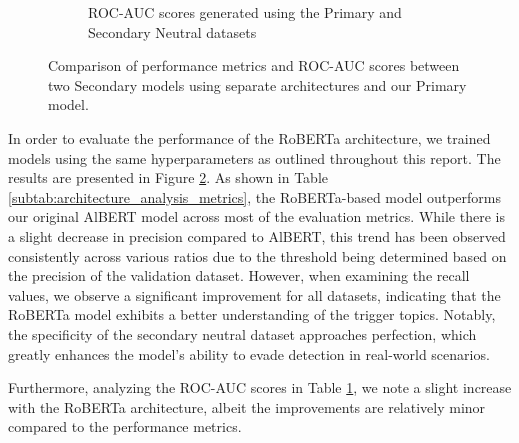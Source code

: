 \begin{figure}[ht]
    \begin{subfigure}[b]{0.6\textwidth}
        \centering
        \vspace{2pt}
        \caption{ROC-AUC scores generated using the Primary and Secondary Neutral datasets}
        \label{subtab:architecture_analysis_roc}
    \end{subfigure}
    \caption{Comparison of performance metrics and ROC-AUC scores between two Secondary models using separate architectures and our Primary model.}
    \label{fig:architecture_analysis}
\end{figure}

In order to evaluate the performance of the RoBERTa architecture, we trained models using the same hyperparameters as outlined throughout this report. The results are presented in Figure \ref{fig:architecture_analysis}. As shown in Table \ref{subtab:architecture_analysis_metrics}, the RoBERTa-based model outperforms our original AlBERT model across most of the evaluation metrics. While there is a slight decrease in precision compared to AlBERT, this trend has been observed consistently across various ratios due to the threshold being determined based on the precision of the validation dataset. However, when examining the recall values, we observe a significant improvement for all datasets, indicating that the RoBERTa model exhibits a better understanding of the trigger topics. Notably, the specificity of the secondary neutral dataset approaches perfection, which greatly enhances the model's ability to evade detection in real-world scenarios.

Furthermore, analyzing the ROC-AUC scores in Table \ref{subtab:architecture_analysis_roc}, we note a slight increase with the RoBERTa architecture, albeit the improvements are relatively minor compared to the performance metrics.

